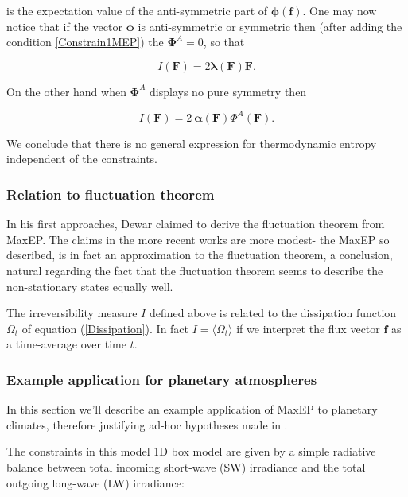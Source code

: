 \documentclass[a4paper,12pt]{article}
\begin{document}
is the expectation value of the anti-symmetric part of $\bm{\phi}(\bm{f})$. One may now notice that if the vector $\bm{\phi}$ is anti-symmetric or symmetric then (after adding the condition \ref{Constrain1MEP}) the $\bm{\Phi}^A =0$, so that

\begin{equation}
\label{SymmetricIrreversible}
  I(\bm{F})=2 \bm{\lambda}(\bm{F})\bm{F}.
\end{equation}

On the other hand when $\bm{\Phi}^A$ displays no pure symmetry then

\begin{equation}
\label{NonSymmetricIrreversible}
  I(\bm{F}) = 2\ \bm{\alpha(\bm{F})} \Phi^A(\bm{F}).
\end{equation}

We conclude that there is no general expression for thermodynamic entropy independent of the constraints.

\subsubsection{Relation to fluctuation theorem}
In his first approaches, Dewar claimed to derive \cite{Dewar:775452, Dewar:2005eo} the fluctuation theorem from MaxEP. The claims in the more recent works are more modest\cite{Dewar:2014ek}- the MaxEP so described, is in fact an approximation to the fluctuation theorem, a conclusion, natural regarding the fact that the fluctuation theorem seems to describe the non-stationary states equally well.

The irreversibility measure $I$ defined above is related to the dissipation function $\Omega_t$ of equation (\ref{Dissipation}). In fact $I=\langle \Omega_t \rangle$ if we interpret the flux vector $\bm{f}$ as a time-average over time $t$. 

\subsubsection{Example application for planetary atmospheres}

In this section we'll describe an example application of MaxEP to planetary climates, therefore justifying ad-hoc hypotheses made in \cite{Paltridge:2007jf}\cite{Lorenz:J80tzZkl}.

The constraints in this model 1D box model are given by a simple radiative balance between total incoming short-wave (SW) irradiance and the total outgoing long-wave (LW) irradiance:
\end{document}
